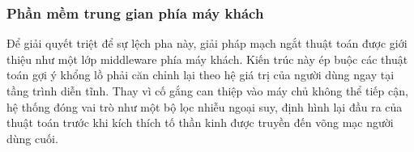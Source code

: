 \subsubsection{Phần mềm trung gian phía máy khách}

Để giải quyết triệt để sự lệch pha này, giải pháp mạch ngắt thuật toán được giới thiệu như một lớp middleware phía máy khách. Kiến trúc này ép buộc các thuật toán gợi ý khổng lồ phải căn chỉnh lại theo hệ giá trị của người dùng ngay tại tầng trình diễn tĩnh. Thay vì cố gắng can thiệp vào máy chủ không thể tiếp cận, hệ thống đóng vai trò như một bộ lọc nhiễu ngoại suy, định hình lại đầu ra của thuật toán trước khi kích thích tố thần kinh được truyền đến võng mạc người dùng cuối.
